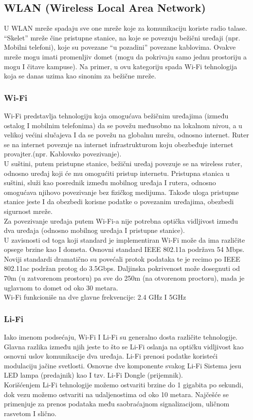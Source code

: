 \documentclass[a4paper]{article}
\begin{document}
{    \subsection{WLAN (Wireless Local Area Network)}
U WLAN mreže spadaju sve one mreže koje za komunikaciju koriste radio talase. “Skelet” mreže čine pristupne stanice, na koje se povezuju bežični uređaji (npr. Mobilni telefoni), koje su povezane “u pozadini” povezane kablovima. Ovakve mreže mogu imati promenljiv domet (mogu da pokrivaju samo jednu prostoriju a mogu I čitave kampuse). Na primer, u ovu kategoriju spada Wi-Fi tehnologija koja se danas uzima kao sinonim za bežične mreže.
        \subsubsection{Wi-Fi}
Wi-Fi predstavlja tehnologiju koja omogućava bežičnim uređajima (između ostalog I mobilnim telefonima) da se povežu međusobno na lokalnom nivou, a u velikoj većini slučajeva I da se povežu na globalnu mrežu, odnosno internet. Ruter se na internet povezuje na internet infrastrukturom koju obezbeđuje internet provajter.(npr. Kablovsko povezivanje).\\
U suštini, putem pristupne stanice, bežični uređaj povezuje se na wireless ruter, odnosno uređaj koji će mu omogućiti pristup internetu. Pristupna stanica u suštini, služi kao posrednik između mobilnog uređaja I rutera, odnosno omogućava njihovo povezivanje bez fizičkog medijuma. Takođe uloga pristupne stanice jeste I da obezbedi korisne podatke o povezanim uređajima, obezbedi sigurnost mreže.\\
Za povezivanje uređaja putem Wi-Fi-a nije potrebna optička vidljivost između dva uređaja (odnosno mobilnog uređaja I pristupne stanice).\\
U zavisnosti od toga koji standard je implementiran Wi-Fi može da ima različite opsege brzine kao I dometa. Osnovni standard IEEE 802.11a podržava 54 Mbps. Noviji standardi dramatično su povećali protok podataka te je recimo po IEEE 802.11ac podržan protog do 3.5Gbps. Daljinska pokrivenost može dosegnuti od 70m (u zatvorenom prostoru) pa sve do 250m (na otvorenom proctoru), mada je uglavnom to domet od oko 30 metara.\\
Wi-Fi funkcioniše na dve glavne frekvencije: 2.4 GHz I 5GHz \\
        \subsubsection{Li-Fi}
Iako imenom podsećaju, Wi-Fi I Li-Fi su generalno dosta različite tehnologije.\\
Glavna razlika između njih jeste to što se Li-Fi oslanja na optičku vidljivost kao osnovni uslov komunikacije dva uređaja. Li-Fi prenosi podatke koristeći modulaciju jačine svetlosti. Osnovne dve komponente svakog Li-Fi Sistema jesu LED lampa (predajnik) kao I tzv. Li-Fi Dongle (prijemnik). \\
Korišćenjem Li-Fi tehnologije možemo ostvariti brzine do 1 gigabita po sekundi, dok vezu možemo ostvariti na udaljenostima od oko 10 metara.
Najčešće se primenjuje za prenos podataka među saobraćajnom signalizacijom, uličnom rasvetom I slično.\\

}
\end{document}
